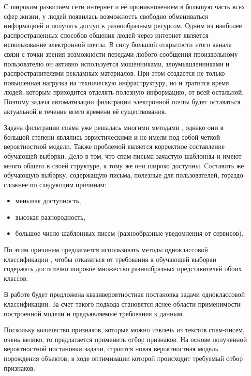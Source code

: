 С широким развитием сети интернет и её проникновением в большую часть всех сфер жизни, у людей появилась возможность свободно обмениваться информацией и получать доступ к разнообразным ресурсом. 
Одним из наиболее распространенных способов общения людей через интернет является использование электронной почты. 
В силу большой открытости этого канала связи с точки зрения возможности передачи любого сообщения произвольному пользователю он активно используется мошенниками, злоумышленниками и распространителями рекламных материалов. При этом создается не только повышенная нагрузка на техническую инфраструктуру, но и тратится время людей, которым приходится отделять полезную информацию, от всей остальной. 
Поэтому задача автоматизации фильтрации электронной почты будет оставаться актуальной в течение всего времени её существования.

Задача фильтрации спама уже решалась многими методами \cite{Islam2007, Sun2008}, однако они в большой степени являлись эвристическими и не имели под собой четкой вероятностной модели. 
Также проблемой является корректное составление обучающей выборки. 
Дело в том, что спам-письма зачастую шаблонны и имеют много общего в своей структуре, к тому же они широко доступны. 
Составить же обучающую выборку, содержащую письма, полезные для пользователей, гораздо сложнее по следующим причинам:
\begin{itemize}
	\item меньшая доступность,
	\item высокая разнородность,
	\item большое число шаблонных писем (разнообразные уведомления от сервисов).
\end{itemize}
По этим причинам предлагается использовать методы одноклассовой классификации \cite{Tax2001, Khan2006}, чтобы отказаться от требования к обучающей выборки содержать достаточно широкое множество разнообразных представителей обоих классов.

В работе будет предложена квазивероятностная постановка задачи одноклассовой классификации. 
За счет такого подхода становятся яснее области применимости построенной модели и предъявляемые требования к данным.

Поскольку количество признаков, которые можно извлечь из текстов спам-писем, очень велико, то предлагается применить отбор признаков. 
На основе полученной вероятностной постановки задачи, строится новая вероятностная модель порождения объектов, в ходе оптимизации которой происходит требуемый отбор признаков.

